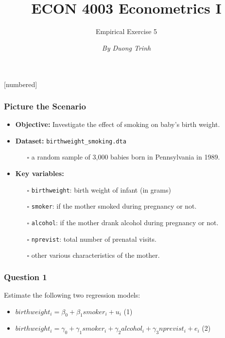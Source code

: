\documentclass[11pt, xcolor=x11names,compress]{beamer}
\title [ECON 4003: Empirical Exercise 5]{ECON 4003 Econometrics I}
\author[]{Empirical Exercise 5}
\date[]{\textit{By Duong Trinh}}
\begin{document}
[numbered]
{
\frame{\titlepage}}


\begin{frame}[fragile,t]
\linespread{1.3}
\frametitle{Picture the Scenario}
\begin{itemize}
    \item \textbf{Objective:} Investigate the effect of smoking on baby's birth weight.
    \item \textbf{Dataset:} \texttt{birthweight\_smoking.dta} 
    \begin{itemize}
        \item [$\square$] a random sample of 3,000 babies born in Pennsylvania in 1989. 
    \end{itemize}
    \item \textbf{Key variables:}
    \begin{itemize}
        \item [$\square$] \texttt{birthweight}: birth weight of infant (in grams) 
        \item [$\square$] \texttt{smoker}: if the mother smoked during pregnancy or not.
        \item [$\square$] \texttt{alcohol}: if the mother drank alcohol during pregnancy or not.
        \item [$\square$] \texttt{nprevist}: total number of prenatal visits.
        \item [$\square$] other various characteristics of the mother.
    \end{itemize}
\end{itemize}
\end{frame}

\begin{frame}[fragile,t]
\frametitle{Question 1} 

\vspace{15mm}

Estimate the following two regression models:
\begin{itemize}
    \item $birthweight_i=\beta_{0}+\beta_{1} smoker_{i}+u_{i}$ \hspace{2mm} (1)
    \item $birthweight_i=\gamma_{0}+\gamma_{1} smoker_{i}+\gamma_{2} alcohol_{i} + \gamma_{3} nprevist_{i} + e_{i}$ \hspace{2mm} (2)
\end{itemize}
\end{frame}
\end{document}
